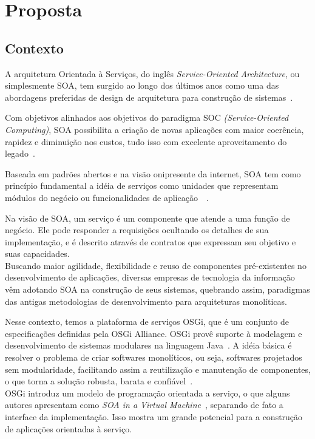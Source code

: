 \chapter{Proposta}
\section{Contexto}
\label{pr:contex}

A arquitetura Orientada à Serviços, do inglês \textit{Service-Oriented Architecture}, ou simplesmente SOA, tem surgido ao longo dos últimos anos como uma das abordagens preferidas de design de arquitetura para construção de sistemas~\cite{erl2008soa}.

Com objetivos alinhados aos objetivos do paradigma SOC \textit{(Service-Oriented Computing)}, SOA possibilita a criação de novas aplicações com maior coerência, rapidez e diminuição nos custos, tudo isso com excelente aproveitamento do legado~\cite{erl2008soa}.

Baseada em padrões abertos e na visão onipresente da internet, SOA tem como princípio fundamental a idéia de serviços como unidades que representam módulos do negócio ou funcionalidades de aplicação~\cite{erl2008soa}~\cite{imb2007soa}.

Na visão de SOA, um serviço é um componente que atende a uma função de negócio. Ele pode responder a requisições ocultando os detalhes de sua implementação, e é descrito através de contratos que expressam seu objetivo e suas capacidades.
\\

Buscando maior agilidade, flexibilidade e reuso de componentes pré-existentes no desenvolvimento de aplicações, diversas empresas de tecnologia da informação vêm adotando SOA na construção de seus sistemas, quebrando assim, paradigmas das antigas metodologias de desenvolvimento para arquiteturas monolíticas.

Nesse contexto, temos a plataforma de serviços OSGi, que é um conjunto de especificações definidas pela OSGi Alliance. OSGi provê suporte à modelagem e desenvolvimento de sistemas modulares na linguagem Java~\cite{hall2010osgi}. A idéia básica é resolver o problema de criar softwares monolíticos, ou seja, softwares projetados sem modularidade, facilitando assim a reutilização e manutenção de  componentes, o que torna a solução robusta, barata e confiável~\cite{davis2009open}.
\\

OSGi introduz um modelo de programação orientada a serviço, o que alguns autores apresentam como \textit{SOA in a Virtual Machine}~\cite{hall2010osgi}, separando de fato a interface da implementação. Isso mostra um grande potencial para a construção de aplicações orientadas à serviço.


